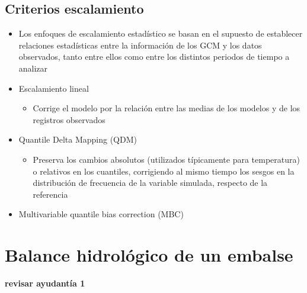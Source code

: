 \subsection{Criterios escalamiento}
\begin{itemize}
    \item Los enfoques de escalamiento estadístico se basan en el supuesto de establecer relaciones estadísticas entre la información de los GCM y los datos observados, tanto entre ellos como entre los distintos periodos de tiempo a analizar
    \item Escalamiento lineal
    \begin{itemize}
        \item Corrige el modelo por la relación entre las medias de los modelos y de los registros observados
    \end{itemize}
    \item Quantile Delta Mapping (QDM)
    \begin{itemize}
        \item Preserva los cambios absolutos (utilizados típicamente para temperatura) o relativos en los cuantiles, corrigiendo al mismo tiempo los sesgos en la distribución de frecuencia de la variable simulada, respecto de la referencia
    \end{itemize}
    \item Multivariable quantile bias correction (MBC)
\end{itemize}

\section{Balance hidrológico de un embalse}
\textbf{revisar ayudantía 1}



